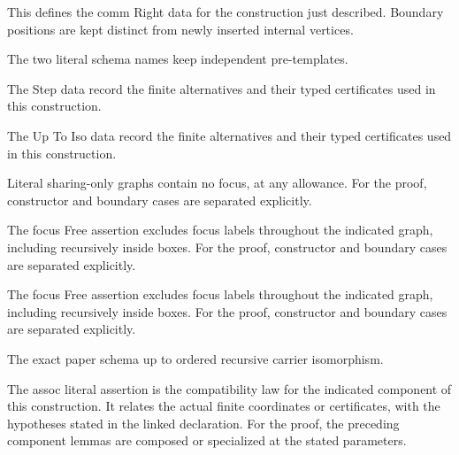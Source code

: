 This defines the comm Right data for the construction just described. Boundary positions are kept distinct from newly inserted internal vertices.
\par{}

The two literal schema names keep independent pre-templates.
\par{}

The Step data record the finite alternatives and their typed certificates used in this construction.
\par{}

The Up To Iso data record the finite alternatives and their typed certificates used in this construction.
\par{}

Literal sharing-only graphs contain no focus, at any allowance.
For the proof, constructor and boundary cases are separated explicitly.
\par{}

The focus Free assertion excludes focus labels throughout the indicated graph, including recursively inside boxes.
For the proof, constructor and boundary cases are separated explicitly.
\par{}

The focus Free assertion excludes focus labels throughout the indicated graph, including recursively inside boxes.
For the proof, constructor and boundary cases are separated explicitly.
\par{}

The exact paper schema up to ordered recursive carrier isomorphism.
\par{}

The assoc literal assertion is the compatibility law for the indicated component of this construction. It relates the actual finite coordinates or certificates, with the hypotheses stated in the linked declaration.
For the proof, the preceding component lemmas are composed or specialized at the stated parameters.
\par{}

